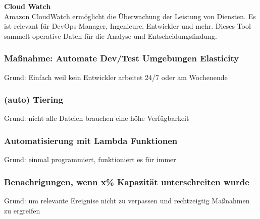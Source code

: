 \textbf{Cloud Watch}\\
Amazon CloudWatch ermöglicht die Überwachung der Leistung von Diensten. Es ist relevant für DevOps-Manager, Ingenieure, Entwickler und mehr. Dieses Tool sammelt operative Daten für die Analyse und Entscheidungsfindung.

\subsubsection{Maßnahme: Automate Dev/Test Umgebungen Elasticity}
Grund: Einfach weil kein Entwickler arbeitet 24/7 oder am Wochenende

\subsubsection{(auto) Tiering }
Grund: nicht alle Dateien brauchen eine höhe Verfügbarkeit

\subsubsection{Automatisierung mit Lambda Funktionen}
Grund: einmal programmiert, funktioniert es für immer

\subsubsection{Benachrigungen, wenn x\% Kapazität unterschreiten wurde}
Grund: um relevante Ereignise nicht zu verpassen und rechtzeigtig Maßnahmen zu ergreifen



  